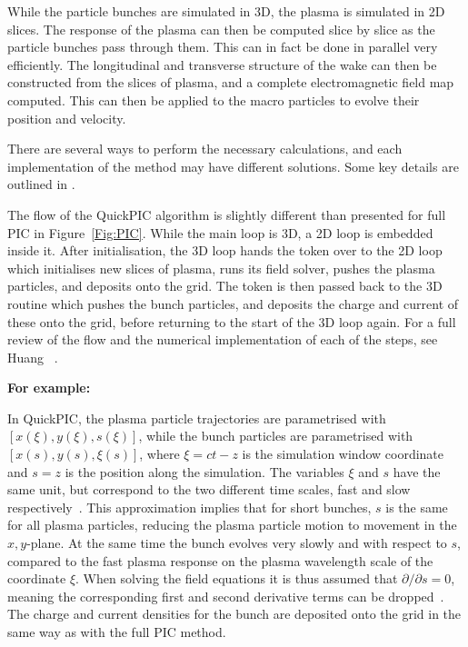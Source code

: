 While the particle bunches are simulated in 3D, the plasma is simulated in 2D slices.
The response of the plasma can then be computed slice by slice as the particle bunches pass through them.
This can in fact be done in parallel very efficiently.
The longitudinal and transverse structure of the wake can then be constructed from the slices of plasma, and a complete electromagnetic field map computed.
This can then be applied to the macro particles to evolve their position and velocity.

There are several ways to perform the necessary calculations, and each implementation of the method may have different solutions.
Some key details are outlined in \cite{vay:2016}.

The flow of the QuickPIC algorithm is slightly different than presented for full PIC in Figure~\ref{Fig:PIC}.
While the main loop is 3D, a 2D loop is embedded inside it.
After initialisation, the 3D loop hands the token over to the 2D loop which initialises new slices of plasma, runs its field solver, pushes the plasma particles, and deposits onto the grid.
The token is then passed back to the 3D routine which pushes the bunch particles, and deposits the charge and current of these onto the grid, before returning to the start of the 3D loop again.
For a full review of the flow and the numerical implementation of each of the steps, see Huang \etal~\cite{huang:2006}.

\bigskip
\noindent\textbf{For example:}
\bigskip

In QuickPIC, the plasma particle trajectories are parametrised with $[x(\xi), y(\xi), s(\xi)]$, while the bunch particles are parametrised with $[x(s),y(s),\xi(s)]$, where $\xi = ct - z$ is the simulation window coordinate and $s=z$ is the position along the simulation.
The variables $\xi$ and $s$ have the same unit, but correspond to the two different time scales, fast and slow respectively~\cite{huang:2006}.
This approximation implies that for short bunches, $s$ is the same for all plasma particles, reducing the plasma particle motion to movement in the $x,y$-plane.
At the same time the bunch evolves very slowly and with respect to $s$, compared to the fast plasma response on the plasma wavelength scale of the coordinate $\xi$.
When solving the field equations it is thus assumed that $\partial/\partial s = 0$, meaning the corresponding first and second derivative terms can be dropped~\cite{an:2013}.
The charge and current densities for the bunch are deposited onto the grid in the same way as with the full PIC method.

